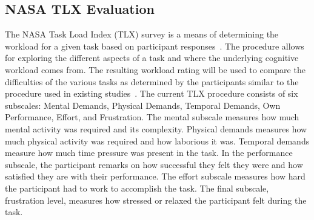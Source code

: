 \documentclass[11pt]{article}
\begin{document}
\subsection{NASA TLX Evaluation}
The NASA Task Load Index (TLX) survey is a means of determining the workload for a given task based on participant responses~\cite{NASA}. The procedure allows for exploring the different aspects of a task and where the underlying cognitive workload comes from. The resulting workload rating will be used to compare the difficulties of the various tasks as determined by the participants similar to the procedure used in existing studies~\cite{Ke}. The current TLX procedure consists of six subscales: Mental Demands, Physical Demands, Temporal Demands, Own Performance, Effort, and Frustration. The mental subscale measures how much mental activity was required and its complexity. Physical demands measures how much physical activity was required and how laborious it was. Temporal demands measure how much time pressure was present in the task. In the performance subscale, the participant remarks on how successful they felt they were and how satisfied they are with their performance. The effort subscale measures how hard the participant had to work to accomplish the task. The final subscale, frustration level, measures how stressed or relaxed the participant felt during the task.
\end{document}
